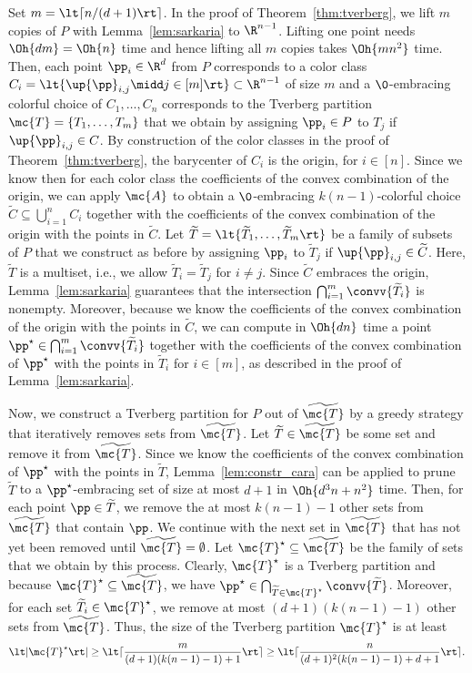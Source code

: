 \begin{prf}
\newcommand{\kch}[1]{\widetilde{#1}}
Set $m = \lt\lceil n / (d+1)\rt\rceil$.
In the proof of Theorem~\ref{thm:tverberg},
we lift $m$ copies of $P$ with Lemma~\ref{lem:sarkaria} to $\R^{n-1}$. 
Lifting one
point needs $\Oh{dm} = \Oh{n}$ time and hence lifting all $m$ copies takes
$\Oh{mn^2}$ time. Then, each point $\pp_i \in \R^d$ from $P$
corresponds to a color class $C_i =
\lt\{\up{\pp}_{i,j} \midd j \in [m]\rt\} \subset \R^{n-1}$
of size $m$ and a $\0$-embracing colorful choice of $C_1,\dots,C_n$
corresponds to the Tverberg partition $\mc{T}=\{T_1,\dots,T_m\}$ that 
we obtain
by assigning $\pp_i \in P$ to $T_j$ if $\up{\pp}_{i,j} \in C$.
By construction of the color classes in the proof of
Theorem~\ref{thm:tverberg}, the barycenter of $C_i$ is the origin, for 
$i \in [n]$.
Since we know then for each color class the coefficients of the convex
combination of
the origin, we can apply $\mc{A}$ to
obtain a $\0$-embracing $k(n-1)$-colorful choice $\kch{C} \subseteq
\bigcup_{i=1}^n C_i$ together with the coefficients of the convex 
combination of
the origin with the points in $\kch{C}$.
Let
$\kch{T}=\lt\{\kch{T}_1,\dots,\kch{T}_m\rt\}$ be a family of
subsets of $P$ that we construct as before by assigning $\pp_i$ to 
$\kch{T}_j$ if
$\up{\pp}_{i,j} \in \kch{C}$. Here, $\kch{T}$ is a multiset, i.e., we allow
$\kch{T}_i = \kch{T}_j$ for $i\neq
j$. Since $\kch{C}$ embraces the origin, Lemma~\ref{lem:sarkaria}
guarantees that the intersection $\bigcap_{i=1}^m \convv{\kch{T}_i}$ is
nonempty. Moreover, because we know the coefficients of the convex 
combination of the origin with the points in $\kch{C}$, we can 
compute in $\Oh{dn}$ time a
point $\pp^\star \in \bigcap_{i=1}^m \convv{\kch{T}_i}$ together with the
coefficients of the convex combination of $\pp^\star$ with the points in
$\kch{T}_i$ for $i \in [m]$, as described in the proof of 
Lemma~\ref{lem:sarkaria}.

Now, we construct a Tverberg partition for $P$ out of
$\kch{\mc{T}}$ by a greedy strategy that iteratively
removes sets from $\kch{\mc{T}}$. Let $\kch{T} \in
\kch{\mc{T}}$ be some set and remove it from $\kch{\mc{T}}$. 
Since we know the coefficients of the convex
combination of $\pp^\star$ with the points in $\kch{T}$,
Lemma~\ref{lem:constr_cara} can be applied to prune $\kch{T}$
to a $\pp^\star$-embracing set of size at most $d+1$ in 
$\Oh{d^3n + n^2}$ time. Then, for each point $\pp \in
\kch{T}$, we remove the at most $k(n-1)-1$ other sets from
$\kch{\mc{T}}$ that contain $\pp$. We continue with the next set
in $\kch{\mc{T}}$ that has not yet been removed until $\kch{\mc{T}} =
\emptyset$. Let $\mc{T}^\star \subseteq
\kch{\mc{T}}$ be the family of sets that we obtain by this process.
Clearly, $\mc{T}^\star$ is a Tverberg partition and 
because $\mc{T}^\star \subseteq \kch{\mc{T}}$, we have $\pp^\star \in
\bigcap_{\kch{T} \in \mc{T}^\star} \convv{\kch{T}}$.
Moreover, for each set
$\kch{T}_i \in \mc{T}^\star$, we remove at most $(d+1)(k(n-1)-1)$
other sets from $\kch{\mc{T}}$. Thus, the size of the Tverberg partition
$\mc{T}^\star$ is at least
\[
  \lt|\mc{T}^\star\rt|
  \geq \lt\lceil \frac{m}{(d+1)(k(n-1)-1)+1}\rt\rceil
  \geq \lt\lceil \frac{n}{(d+1)^2(k(n-1)-1)+d+1}\rt\rceil.
\]


\end{prf}
